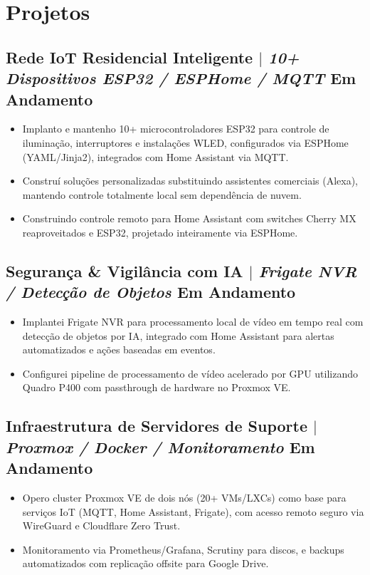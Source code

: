 \documentclass[10pt]{article}
\begin{document}
\section{Projetos}
\subsection{Rede IoT Residencial Inteligente $|$ \normalfont\textit{10+ Dispositivos ESP32 / ESPHome / MQTT} \hfill Em Andamento}
\begin{itemize}
	\item Implanto e mantenho 10+ microcontroladores ESP32 para controle de ilumina\c{c}\~{a}o, interruptores e instala\c{c}\~{o}es WLED, configurados via ESPHome (YAML/Jinja2), integrados com Home Assistant via MQTT.
	\item Constru\'{i} solu\c{c}\~{o}es personalizadas substituindo assistentes comerciais (Alexa), mantendo controle totalmente local sem depend\^{e}ncia de nuvem.
	\item Construindo controle remoto para Home Assistant com switches Cherry MX reaproveitados e ESP32, projetado inteiramente via ESPHome.
\end{itemize}

\subsection{Seguran\c{c}a \& Vigil\^{a}ncia com IA $|$ \normalfont\textit{Frigate NVR / Detec\c{c}\~{a}o de Objetos} \hfill Em Andamento}
\begin{itemize}
	\item Implantei Frigate NVR para processamento local de v\'{i}deo em tempo real com detec\c{c}\~{a}o de objetos por IA, integrado com Home Assistant para alertas automatizados e a\c{c}\~{o}es baseadas em eventos.
	\item Configurei pipeline de processamento de v\'{i}deo acelerado por GPU utilizando Quadro P400 com passthrough de hardware no Proxmox VE.
\end{itemize}

\subsection{Infraestrutura de Servidores de Suporte $|$ \normalfont\textit{Proxmox / Docker / Monitoramento} \hfill Em Andamento}
\begin{itemize}
	\item Opero cluster Proxmox VE de dois n\'{o}s (20+ VMs/LXCs) como base para servi\c{c}os IoT (MQTT, Home Assistant, Frigate), com acesso remoto seguro via WireGuard e Cloudflare Zero Trust.
	\item Monitoramento via Prometheus/Grafana, Scrutiny para discos, e backups automatizados com replica\c{c}\~{a}o offsite para Google Drive.
\end{itemize}
\end{document}
